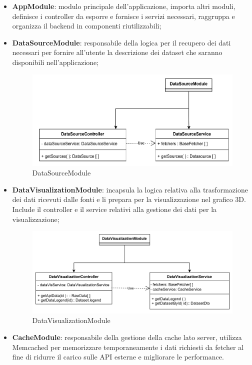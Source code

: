 \begin{itemize}
    \item \textbf{AppModule}: modulo principale dell'applicazione, importa altri moduli, definisce i controller da esporre e fornisce i servizi necessari, raggruppa e organizza il backend in componenti riutilizzabili;
    \item \textbf{DataSourceModule}: responsabile della logica per il recupero dei dati necessari per fornire all'utente la descrizione dei dataset che saranno disponibili nell'applicazione;
    \begin{figure}[h!] \centering       
        \includegraphics[scale = 0.5]{template/images/DataSourceModule.png}
        \caption{DataSourceModule}
    \end{figure}
    \item \textbf{DataVisualizationModule}: incapsula la logica relativa alla trasformazione dei dati ricevuti dalle fonti e li prepara per la visualizzazione nel grafico 3D. Include il controller e il service relativi alla gestione dei dati per la visualizzazione;
    \begin{figure}[h!] \centering       
        \includegraphics[scale = 0.3]{template/images/DataVisualizationModule.png}
        \caption{DataVisualizationModule}
    \end{figure}
    \newpage
    \item \textbf{CacheModule}: responsabile della gestione della cache lato server, utilizza Memcached per memorizzare temporaneamente i dati richiesti da fetcher al fine di ridurre il carico sulle API esterne e migliorare le performance.

\end{itemize}
